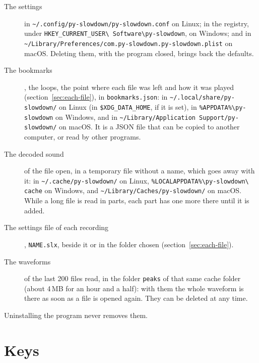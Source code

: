 \documentclass[12pt,
              article,
              oneside
              ]{memoir}
\begin{document}
%
\begin{description}
\item[The settings] in
  \texttt{\textasciitilde/.config/py-slowdown/py-slowdown.conf} on Linux;
  in the registry, under \texttt{HKEY\_CURRENT\_USER\textbackslash
  Software\textbackslash py-slowdown}, on Windows; and in
  \texttt{\textasciitilde/Library/Preferences/com.py-slowdown.py-slowdown.plist}
  on macOS. Deleting them, with the program closed, brings back the
  defaults.
\item[The bookmarks], the loops, the point where each file was left and
  how it was played (section~\ref{sec:each-file}), in
  \texttt{bookmarks.json}: in \texttt{\textasciitilde/.local/share/py-slowdown/}
  on Linux (in \texttt{\$XDG\_DATA\_HOME}, if it is set), in
  \texttt{\%APPDATA\%\textbackslash py-slowdown} on Windows, and in
  \texttt{\textasciitilde/Library/Application Support/py-slowdown/} on
  macOS. It is a JSON file that can be copied to another computer, or read
  by other programs.
\item[The decoded sound] of the file open, in a temporary file without a
  name, which goes away with it: in \texttt{\textasciitilde/.cache/py-slowdown/}
  on Linux, \texttt{\%LOCALAPPDATA\%\textbackslash py-slowdown\textbackslash
  cache} on Windows, and \texttt{\textasciitilde/Library/Caches/py-slowdown/}
  on macOS. While a long file is read in parts, each part has one more
  there until it is added.
\item[The settings file of each recording], \texttt{NAME.slx}, beside it or
  in the folder chosen (section~\ref{sec:each-file}).
\item[The waveforms] of the last 200 files read, in the folder
  \texttt{peaks} of that same cache folder (about 4\,MB for an hour and a
  half): with them the whole waveform is there as soon as a file is opened
  again. They can be deleted at any time.
\end{description}

\noindent Uninstalling the program never removes them.

\section{Keys}
\end{document}
